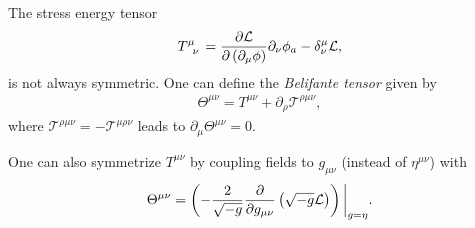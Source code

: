 \begin{note}
    The stress energy tensor
    \begin{align}
        \tensor{T}{^{\mu}_\nu} = \pdv{\mathcal{L}}{\left( \partial_\mu \phi \right) } \partial_\nu \phi_a - \delta^{\mu}_\nu \mathcal{L}
    ,\end{align}
    is not always symmetric. One can define the \textit{Belifante tensor} given by
    \begin{align}
        \Theta^{\mu \nu} = T^{\mu \nu} + \partial_\rho \mathcal{T}^{\rho \mu \nu}
    ,\end{align}
    where $\mathcal{T}^{\rho \mu \nu} = - \mathcal{T}^{\mu \rho \nu}$ leads to $\partial_\mu \Theta^{\mu \nu} = 0$.

    One can also symmetrize $T^{\mu \nu}$ by coupling fields to $g_{\mu \nu}$ (instead of $\eta^{\mu \nu}$) with
    \begin{align}
        \Theta^{\mu \nu} = \left( -\frac{2}{\sqrt{-g} } \pdv{g_{\mu \nu}} \left( \sqrt{-g}  \mathcal{L} \right) \right)  \bigg|_{g = \eta}
    .\end{align}
\end{note}



